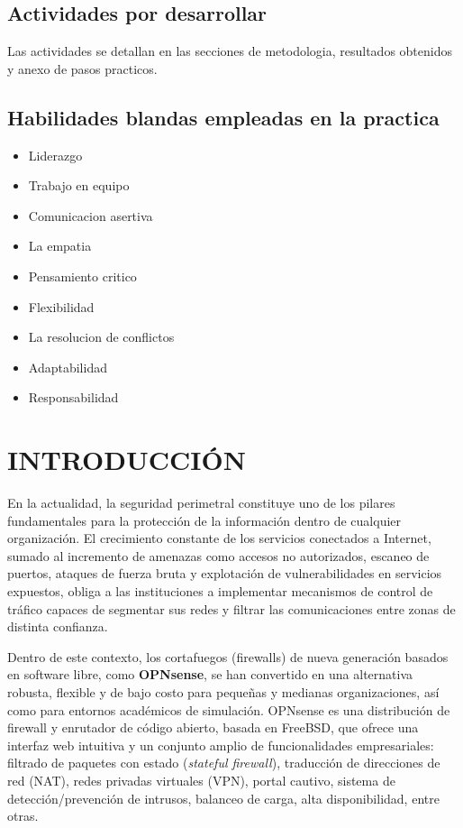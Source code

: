 \documentclass{article}
\renewcommand{\_}{\oldunderscore\hskip0pt\relax}
\begin{document}
\subsection*{Actividades por desarrollar}
Las actividades se detallan en las secciones de metodologia, resultados obtenidos y anexo de pasos practicos.

\subsection*{Habilidades blandas empleadas en la practica}
\begin{itemize}
    \item[$\square$] Liderazgo
    \item[$\boxtimes$] Trabajo en equipo
    \item[$\boxtimes$] Comunicacion asertiva
    \item[$\square$] La empatia
    \item[$\boxtimes$] Pensamiento critico
    \item[$\boxtimes$] Flexibilidad
    \item[$\square$] La resolucion de conflictos
    \item[$\boxtimes$] Adaptabilidad
    \item[$\boxtimes$] Responsabilidad
\end{itemize}

\newpage
\tableofcontents
\newpage
\hypertarget{introducciuxf3n}{%
\section{INTRODUCCIÓN}\label{introducciuxf3n}}

En la actualidad, la seguridad perimetral constituye uno de los pilares
fundamentales para la protección de la información dentro de cualquier
organización. El crecimiento constante de los servicios conectados a
Internet, sumado al incremento de amenazas como accesos no autorizados,
escaneo de puertos, ataques de fuerza bruta y explotación de
vulnerabilidades en servicios expuestos, obliga a las instituciones a
implementar mecanismos de control de tráfico capaces de segmentar sus
redes y filtrar las comunicaciones entre zonas de distinta confianza.

Dentro de este contexto, los cortafuegos (firewalls) de nueva generación
basados en software libre, como \textbf{OPNsense}, se han convertido en
una alternativa robusta, flexible y de bajo costo para pequeñas y
medianas organizaciones, así como para entornos académicos de
simulación. OPNsense es una distribución de firewall y enrutador de
código abierto, basada en FreeBSD, que ofrece una interfaz web intuitiva
y un conjunto amplio de funcionalidades empresariales: filtrado de
paquetes con estado (\emph{stateful firewall}), traducción de
direcciones de red (NAT), redes privadas virtuales (VPN), portal
cautivo, sistema de detección/prevención de intrusos, balanceo de carga,
alta disponibilidad, entre otras.
\end{document}

